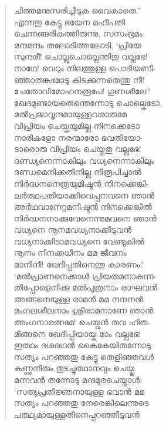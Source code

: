 \begin{verse}
ചിത്തമനുസരിച്ചീടുക വൈകാതെ.”\\
എന്നതു കേട്ടു ഭയേന മഹീപതി\\
ചെന്നങ്ങരികത്തിരുന്നു, സസംഭ്രമം\\
മന്ദമന്ദം തലോടിത്തലോടി, ‘പ്രിയേ\\
സുന്ദരീ! ചൊല്ലുചൊല്ലെന്തിതു വല്ലഭേ!\\
നാഥേ! വെറും നിലത്തുള്ള പൊടിയണി-\\
ഞ്ഞാതങ്കമോടു കിടക്കുന്നതെന്തു നീ!\\
ചേതോവിമോഹനരൂപേ! ഗുണശീലേ?\\
ഖേദമുണ്ടായതെന്തെന്നോടു ചൊല്കെടോ.\\
മല്‍പ്രജാവൃന്ദമായുള്ളവരാരുമേ\\
വിപ്രിയം ചെയ്കയുമില്ല നിനക്കെടോ\\
നാരികളോ നരന്മാരോ ഭവതിയോ-\\
ടാരൊരു വിപ്രിയം ചെയ്തതു വല്ലഭേ!\\
ദണ്ഡ്യനെന്നാകിലും വധ്യനെന്നാകിലും\\
ദണ്ഡമെനിക്കതിനില്ല നിരൂപിച്ചാല്‍\\
നിര്‍ദ്ധനനെത്രയുമിഷ്ടന്‍ നിനക്കെങ്കി-\\
ലര്‍ത്ഥപതിയാക്കിവെപ്പനവനെ ഞാന്‍\\
അര്‍ഥവാനേറ്റമനിഷ്ടന്‍ നിനക്കെങ്കില്‍\\
നിര്‍ദ്ധനനാക്കുവേനെന്നുമവനെ ഞാന്‍\\
വധ്യനെ നൂനമവധ്യനാക്കീടുവന്‍\\
വധ്യനാക്കിടാമവധ്യനെ വേണ്ടുകില്‍\\
നൂനം നിനക്കധീനം മമ ജീവനം\\
മാനിനീ! ഖേദിപ്പതിനെന്തു കാരണം?\\
‘മല്‍പ്രാണനെക്കാള്‍ പ്രിയതമനാകുന്ന-\\
തിപ്പോളെനിക്കു മല്‍പുത്രനാം രാഘവന്‍\\
അങ്ങനെയുള്ള രാമന്‍ മമ നന്ദനന്‍\\
മംഗലശീലനാം ശ്രീരാമനാണേ ഞാന്‍\\
അംഗനാരത്നമേ! ചെയ്വന്‍ തവ ഹിത-\\
മിങ്ങനെ ഖേദിപ്പിയായ്ക മാം വല്ലഭേ!\\
ഇത്ഥം ദശരഥന്‍ കൈകേയിതന്നോടു\\
സത്യം പറഞ്ഞതു കേട്ടു തെളിഞ്ഞവള്‍\\
കണ്ണുനീരും തുടച്ചുത്ഥാനവും ചെയ്തു\\
മന്നവന്‍ തന്നോടു മന്ദമുരചെയ്താള്‍:\\
‘സത്യപ്രതിജ്ഞനായുള്ള ഭവാന്‍ മമ\\
സത്യം പറഞ്ഞതു നേരെങ്കിലെന്നുടെ\\
പത്ഥ്യമായുള്ളതിനെപ്പറഞ്ഞീടുവന്‍\\

\end{verse}
